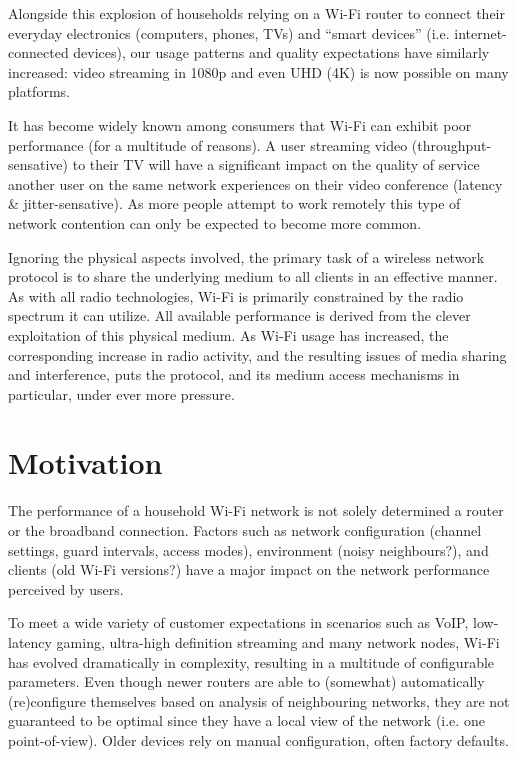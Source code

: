 Alongside this explosion of households relying on a Wi-Fi router to connect
their everyday electronics (computers, phones, TVs) and ``smart devices''
(i.e. internet-connected devices), our usage patterns and quality expectations
have similarly increased: video streaming in 1080p and even UHD (4K) is now
possible on many platforms.

It has become widely known among consumers that Wi-Fi can exhibit poor
performance (for a multitude of reasons). A user streaming video
(throughput-sensative) to their TV will have a significant impact on the
quality of service another user on the same network experiences on their video
conference (latency \& jitter-sensative). As more people attempt to work
remotely this type of network contention can only be expected to become more
common.

Ignoring the physical aspects involved, the primary task of a wireless network
protocol is to share the underlying medium to all clients in an effective
manner. As with all radio technologies, Wi-Fi is primarily constrained by the
radio spectrum it can utilize. All available performance is derived from the
clever exploitation of this physical medium. As Wi-Fi usage has increased, the
corresponding increase in radio activity, and the resulting issues of media
sharing and interference, puts the protocol, and its medium access mechanisms
in particular, under ever more pressure.

\section{Motivation}


The performance of a household Wi-Fi network is not solely determined a router
or the broadband connection. Factors such as network configuration (channel
settings, guard intervals, access modes), environment (noisy neighbours?), and
clients (old Wi-Fi versions?) have a major impact on the network performance
perceived by users.

To meet a wide variety of customer expectations in scenarios such as VoIP,
low-latency gaming, ultra-high definition streaming and many network nodes,
Wi-Fi has evolved dramatically in complexity, resulting in a multitude of
configurable parameters. Even though newer routers are able to (somewhat)
automatically (re)configure themselves based on analysis of neighbouring
networks, they are not guaranteed to be optimal since they have a local view
of the network (i.e. one point-of-view). Older devices rely on manual
configuration, often factory defaults.

